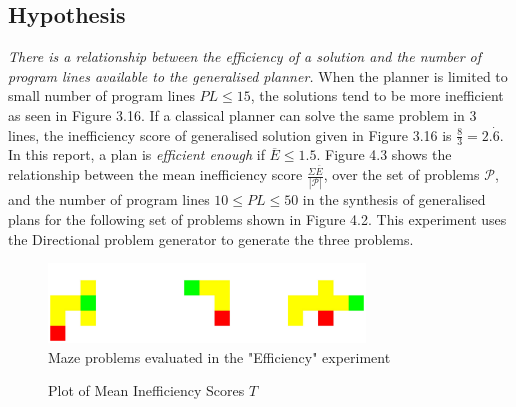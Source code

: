 \subsection{Hypothesis}
\textit{There is a relationship between the efficiency of a solution and the number of program lines available to the generalised planner.} When the planner is limited to small number of program lines $PL \leq 15$, the solutions tend to be more inefficient as seen in Figure 3.16. If a classical planner can solve the same problem in 3 lines, the inefficiency score of generalised solution given in Figure 3.16 is $\frac{8}{3} = 2.\dot{6}$. In this report, a plan is \textit{efficient enough} if $\overline{E} \leq 1.5$. Figure 4.3 shows the relationship between the mean inefficiency score $\frac{\Sigma\overline{E}}{|\mathcal{P}|}$, over the set of problems $\mathcal{P}$, and the number of program lines $10 \leq PL \leq 50$ in the synthesis of generalised plans for the following set of problems shown in Figure 4.2. This experiment uses the Directional problem generator to generate the three problems.

\begin{figure}[h!]
    \centering
    \includegraphics[width=0.75\textwidth]{images/genplanexperiment.png}
    \caption{Maze problems evaluated in the "Efficiency" experiment}
\end{figure}

\begin{figure}[h!]
    \centering
{}
\caption{Plot of Mean Inefficiency Scores $T$}
\end{figure}

